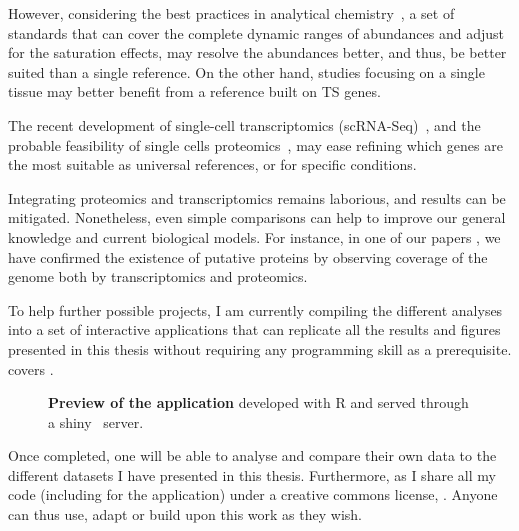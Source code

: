 However,
considering the best practices in analytical chemistry~,
a set of standards that can cover the complete dynamic ranges of abundances
and adjust for the saturation effects,
may resolve the abundances better,
and thus, be better suited than a single reference.
On the other hand, studies focusing on a single tissue
may better benefit from a reference built on \gls{TS} genes.

The recent development of single-cell transcriptomics
(scRNA-Seq)~,
and the probable feasibility of single cells proteomics~,
may ease refining which genes are the most suitable as universal references,
or for specific conditions.

Integrating proteomics and transcriptomics remains laborious,
and results can be mitigated.
Nonetheless,
even simple comparisons %
can help to improve our general knowledge
and current biological models.
For instance, in one of our papers %
,
we have confirmed the existence of putative proteins
by observing coverage of the genome both by transcriptomics and proteomics.

To help further possible projects,
I am currently compiling the different analyses
into a set of interactive applications
that can replicate all the results and figures presented in this thesis
without requiring any programming skill as a prerequisite.
 covers .

\begin{figure}[!ht]
    \centering
    \vspace{-2mm}
    \caption[Application preview]{\label{fig:demoApp}\textbf{Preview of the
    application} developed with \textsf{R}
    and served through a shiny~ server.}
\end{figure}
Once completed, one will be able to analyse and compare their own data
to the different datasets I have presented in this thesis.
Furthermore, as I share all my code (including for the application)
under a creative commons license,
.
Anyone can thus use, adapt or build upon this work as they wish.


